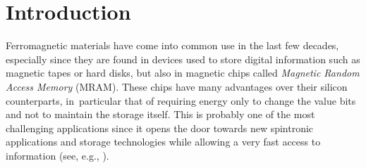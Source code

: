 \documentclass[JEP,XML,SOM,Unicode,NoEqCountersInSection,NoFloatCountersInSection,published]{cedram}
\theoremstyle{definition}
\begin{document}
\maketitle
{\let\nobreakspace\xspace\tableofcontents}
\mainmatter

\section{Introduction}
Ferromagnetic materials have come into common use in the last few decades, especially since they are found in devices used to store digital information such as magnetic tapes or hard disks, but also in magnetic chips called \emph{Magnetic Random Access Memory} (MRAM). These chips have many advantages over their silicon counterparts, in~particular that of requiring energy only to change the value bits and not to maintain the storage itself. This is probably one of the most challenging applications since it opens the door towards new spintronic applications and storage technologies while allowing a very fast access to information (see, e.g., \cite{parkin2008magnetic}).
\end{document}
